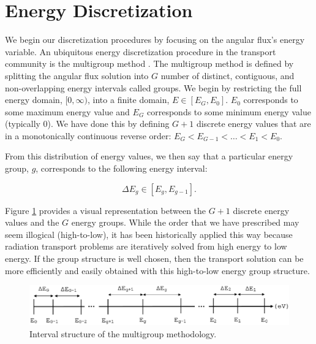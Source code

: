 \section{Energy Discretization}
\label{sec::Sn_MG}

We begin our discretization procedures by focusing on the angular flux's energy variable. An ubiquitous energy discretization procedure in the transport community is the multigroup method \cite{duderstadt1976nuclear,lewis1984computational}. The multigroup method is defined by splitting the angular flux solution into $G$ number of distinct, contiguous, and non-overlapping energy intervals called groups. We begin by restricting the full energy domain, $[0, \infty)$, into a finite domain, $E \in [E_G, E_0]$. $E_0$ corresponds to some maximum energy value and $E_G$ corresponds to some minimum energy value (typically 0). We have done this by defining $G+1$ discrete energy values that are in a monotonically continuous reverse order: $E_G < E_{G-1} <  \ldots < E_1 < E_0$. 

From this distribution of energy values, we then say that a particular energy group, $g$, corresponds to the following energy interval:

\begin{equation}
\label{eq::Sn_MG_energy_interval}
\Delta E_g \in [E_g, E_{g-1}].
\end{equation}

\noindent Figure \ref{fig::Sn_MG_energy_bands} provides a visual representation between the $G+1$ discrete energy values and the $G$ energy groups. While the order that we have prescribed may seem illogical (high-to-low), it has been historically applied this way because radiation transport problems are iteratively solved from high energy to low energy. If the group structure is well chosen, then the transport solution can be more efficiently and easily obtained with this high-to-low energy group structure.

\begin{figure}[bht]
\centering
\includegraphics[width=1.00\textwidth]{figures/sec_Sn/MG_Energy_Bands.eps}
\caption{Interval structure of the multigroup methodology.}
\label{fig::Sn_MG_energy_bands}
\end{figure}

